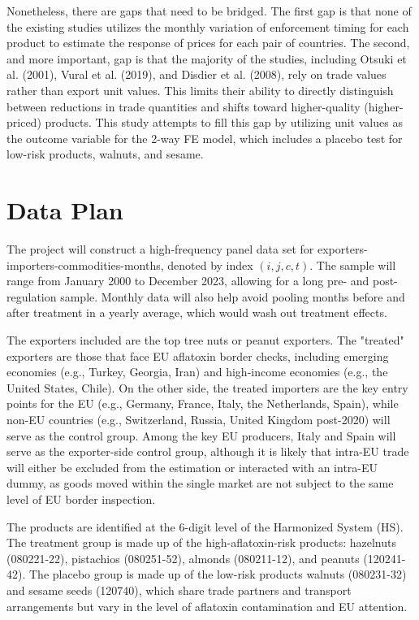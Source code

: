 \documentclass[12pt]{article}
\begin{document}
Nonetheless, there are gaps that need to be bridged. The first gap is that none of the existing studies utilizes the monthly variation of enforcement timing for each product to estimate the response of prices for each pair of countries. The second, and more important, gap is that the majority of the studies, including Otsuki et al. (2001), Vural et al. (2019), and Disdier et al. (2008), rely on trade values rather than export unit values. This limits their ability to directly distinguish between reductions in trade quantities and shifts toward higher-quality (higher-priced) products. This study attempts to fill this gap by utilizing unit values as the outcome variable for the 2-way FE model, which includes a placebo test for low-risk products, walnuts, and sesame.

\section{Data Plan}

The project will construct a high-frequency panel data set for exporters-importers-commodities-months, denoted by index $(i,j,c,t)$. The sample will range from January 2000 to December 2023, allowing for a long pre- and post-regulation sample. Monthly data will also help avoid pooling months before and after treatment in a yearly average, which would wash out treatment effects.

The exporters included are the top tree nuts or peanut exporters. The "treated" exporters are those that face EU aflatoxin border checks, including emerging economies (e.g., Turkey, Georgia, Iran) and high-income economies (e.g., the United States, Chile). On the other side, the treated importers are the key entry points for the EU (e.g., Germany, France, Italy, the Netherlands, Spain), while non-EU countries (e.g., Switzerland, Russia, United Kingdom post-2020) will serve as the control group. Among the key EU producers, Italy and Spain will serve as the exporter-side control group, although it is likely that intra-EU trade will either be excluded from the estimation or interacted with an intra-EU dummy, as goods moved within the single market are not subject to the same level of EU border inspection.

The products are identified at the 6-digit level of the Harmonized System (HS). The treatment group is made up of the high-aflatoxin-risk products: hazelnuts (080221-22), pistachios (080251-52), almonds (080211-12), and peanuts (120241-42). The placebo group is made up of the low-risk products walnuts (080231-32) and sesame seeds (120740), which share trade partners and transport arrangements but vary in the level of aflatoxin contamination and EU attention.
\end{document}
